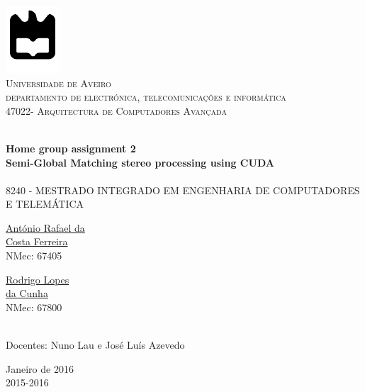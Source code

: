 \begin{titlepage}

\begin{center}

\includegraphics[width=0.15\textwidth]{./logo}\\[0.5cm]    

\textsc{\large Universidade de Aveiro \\[1cm]\large departamento de electrónica, telecomunicações e informática}\\[1cm]

\textsc{\large{47022}\large - Arquitectura de Computadores Avançada \\[1cm]}

\HRule \\[0.5cm]
{ \huge \bfseries  Home group assignment 2}\\[0.4cm]
{ \large \bfseries Semi-Global Matching stereo processing using CUDA}\\[0.4cm]
\HRule \\[1cm]

\textsc{\small{8240 - MESTRADO INTEGRADO EM ENGENHARIA DE COMPUTADORES E TELEMÁTICA}}\\[1cm]

\begin{minipage}{0.4\textwidth}

\begin{flushleft} \large
\href{mailto:rafael.ferreira@ua.pt}{António Rafael da \\ Costa Ferreira }
 \small{\\NMec: 67405}
\end{flushleft}
\end{minipage}
\begin{minipage}{0.4\textwidth}

\begin{flushright} \large
\href{mailto:rodrigocunha@ua.pt}{Rodrigo Lopes \\ da Cunha}
\small{\\NMec: 67800}
\end{flushright}
\end{minipage}\\[1cm]

{\large Docentes: Nuno Lau e José Luís Azevedo   }\\[0.5cm]

\vfill

{\large Janeiro de 2016 \\ 2015-2016}

\end{center}

\end{titlepage}